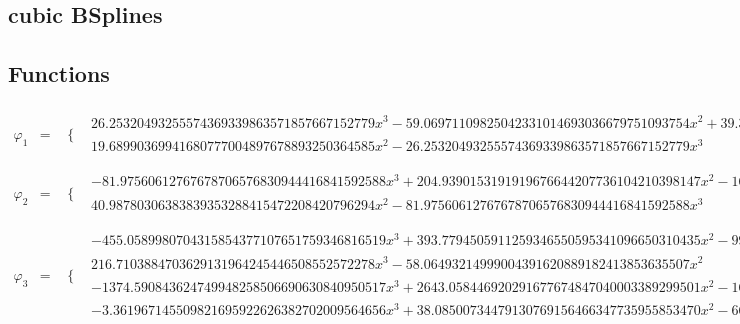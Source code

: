 \documentclass{article}
\begin{document}
 

\begin{landscape}
\section{cubic BSplines}
\subsection{Functions}\begin{eqnarray*} \varphi_1 & = & \begin{array}{cc}
 \{ & 
\begin{array}{cc}
 26.25320493255574369339863571857667152779 x^3-59.06971109825042331014693036679751093754 x^2+39.37980739883361554009795357786500729169 x-6.563301233138935923349658929644167881949 & x\geq \frac{1}{2}\land x<1 \\
 19.68990369941680777004897678893250364585 x^2-26.25320493255574369339863571857667152779 x^3 & x\geq 0\land x<\frac{1}{2}
\end{array}

\end{array}\\
\varphi_2 & = & \begin{array}{cc}
 \{ & 
\begin{array}{cc}
 -81.97560612767678706576830944416841592588 x^3+204.9390153191919676644207736104210398147 x^2-163.9512122553535741315366188883368318518 x+40.98780306383839353288415472208420796294 & x\geq \frac{1}{2}\land x<1 \\
 40.98780306383839353288415472208420796294 x^2-81.97560612767678706576830944416841592588 x^3 & x\geq 0\land x<\frac{1}{2}
\end{array}

\end{array}\\
\varphi_3 & = & \begin{array}{cc}
 \{ & 
\begin{array}{cc}
 -455.0589980704315854377107651759346816519 x^3+393.7794505911259346550595341096650310435 x^2-99.96543139415902079173384237437867015936 x+7.247480591919920578387548188775537372422 & x\geq \frac{1}{4}\land x<\frac{1}{2} \\
 216.7103884703629131964245446508552572278 x^3-58.06493214999004391620889182413853635507 x^2 & x\geq 0\land x<\frac{1}{4} \\
 -1374.590843624749948258506690630840950517 x^3+2643.058446920291677674847040003389299501 x^2-1659.595543557585991695924404176923236968 x+339.6842682856317656281354432984800372706 & x\geq \frac{1}{2}\land x<\frac{3}{4} \\
 -3.361967145509821695922626382702009564656 x^3+38.08500734479130769156466347735955853470 x^2-66.08411325305315029536144780661308837544 x+31.36107305377166429971941071195553940539 & x\geq \frac{3}{4}\land x<1
\end{array}


\end{array}
\end{eqnarray*}
\end{landscape}
\end{document}
